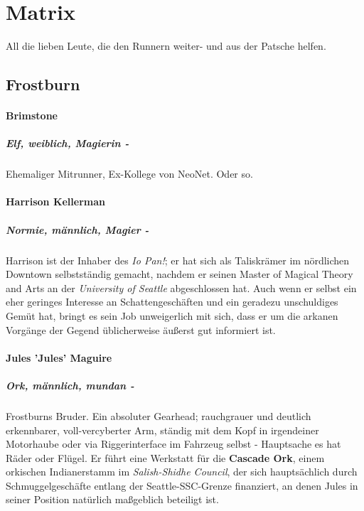 \chapter{Matrix} \label{matrix}
 
All die lieben Leute, die den Runnern weiter- und aus der Patsche helfen.
 
\section{Frostburn}

    \subsubsection{Brimstone}
    \paragraph{Elf, weiblich, Magierin -} Ehemaliger Mitrunner, Ex-Kollege von NeoNet. Oder so.
    
    \subsubsection{Harrison Kellerman}
    \paragraph{Normie, männlich, Magier -} Harrison ist der Inhaber des \textit{Io Pan!}; er hat sich als Taliskrämer im nördlichen Downtown selbstständig gemacht, nachdem er seinen Master of Magical Theory and Arts an der \textit{University of Seattle} abgeschlossen hat. Auch wenn er selbst ein eher geringes Interesse an Schattengeschäften und ein geradezu unschuldiges Gemüt hat, bringt es sein Job unweigerlich mit sich, dass er um die arkanen Vorgänge der Gegend üblicherweise äußerst gut informiert ist.
    
    \subsubsection{Jules 'Jules' Maguire}
    \paragraph{Ork, männlich, mundan -} Frostburns Bruder. Ein absoluter Gearhead; rauchgrauer und deutlich erkennbarer, voll-vercyberter Arm, ständig mit dem Kopf in irgendeiner Motorhaube oder via Riggerinterface im Fahrzeug selbst - Hauptsache es hat Räder oder Flügel. Er führt eine Werkstatt für die \textbf{Cascade Ork}, einem orkischen Indianerstamm im \textit{Salish-Shidhe Council}, der sich hauptsächlich durch Schmuggelgeschäfte entlang der Seattle-SSC-Grenze finanziert, an denen Jules in seiner Position natürlich maßgeblich beteiligt ist.
    
